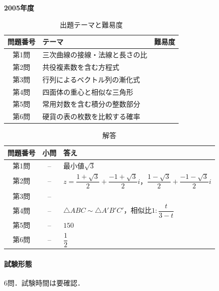 \documentclass[../../main.tex]{subfiles}
\begin{document}
\begin{center}
  {\fontsize{48pt}{58pt}\selectfont \textbf{2005}\normalsize\textbf{年度}}
\end{center}

\begin{table}[htb]
  \centering
  \caption{出題テーマと難易度}
  \begin{tabular}{|c|p{9cm}|c|}
    \hline
    \textbf{問題番号} & \textbf{テーマ} & \textbf{難易度} \\
    \hline
    第1問 & 三次曲線の接線・法線と長さの比 & \\
    \hline
    第2問 & 共役複素数を含む方程式 & \\
    \hline
    第3問 & 行列によるベクトル列の漸化式 & \\
    \hline
    第4問 & 四面体の重心と相似な三角形 & \\
    \hline
    第5問 & 常用対数を含む積分の整数部分 & \\
    \hline
    第6問 & 硬貨の表の枚数を比較する確率 & \\
    \hline
  \end{tabular}
\end{table}

\begin{table}[htb]
  \centering
  \caption{解答}
  \renewcommand{\arraystretch}{1.4}
  \begin{tabular}{|c|c|p{9cm}|}
    \hline
    \textbf{問題番号} & \textbf{小問} & \textbf{答え} \\
    \hline
    第1問 & -- & 最小値$\sqrt{3}$ \\
    \hline
    第2問 & -- & $z=\dfrac{1+\sqrt{3}}{2}+\dfrac{-1+\sqrt{3}}{2}i$，$\dfrac{1-\sqrt{3}}{2}+\dfrac{-1-\sqrt{3}}{2}i$ \\
    \hline
    第3問 & -- &  \\
    \hline
    第4問 & -- & $\triangle ABC\sim\triangle A\prime B\prime C\prime$，相似比$1:\dfrac{t}{3-t}$ \\
    \hline
    第5問 & -- & $150$ \\
    \hline
    第6問 & -- & $\dfrac{1}{2}$ \\
    \hline
  \end{tabular}
\end{table}

\paragraph{試験形態}
6問．試験時間は要確認．
\end{document}
